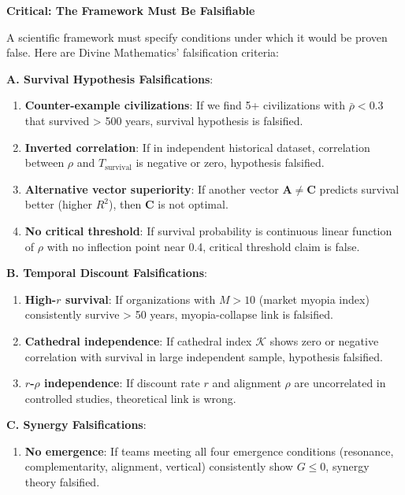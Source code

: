 \documentclass[11pt,a4paper]{article}
\theoremstyle{definition}
\theoremstyle{remark}
\begin{document}
\begin{small}
\begin{enumerate}
\begin{mdframed}[backgroundcolor=red!10,linewidth=2pt,linecolor=red!70!black]
\textbf{Critical: The Framework Must Be Falsifiable}

A scientific framework must specify conditions under which it would be proven false. Here are Divine Mathematics' falsification criteria:

\textbf{A. Survival Hypothesis Falsifications}:
\begin{enumerate}
    \item \textbf{Counter-example civilizations}: If we find 5+ civilizations with \(\bar{\rho} < 0.3\) that survived > 500 years, survival hypothesis is falsified.
    
    \item \textbf{Inverted correlation}: If in independent historical dataset, correlation between \(\rho\) and \(T_{\text{survival}}\) is negative or zero, hypothesis falsified.
    
    \item \textbf{Alternative vector superiority}: If another vector \(\mathbf{A} \neq \mathbf{C}\) predicts survival better (higher \(R^2\)), then \(\mathbf{C}\) is not optimal.
    
    \item \textbf{No critical threshold}: If survival probability is continuous linear function of \(\rho\) with no inflection point near 0.4, critical threshold claim is false.
\end{enumerate}

\textbf{B. Temporal Discount Falsifications}:
\begin{enumerate}
    \item \textbf{High-\(r\) survival}: If organizations with \(M > 10\) (market myopia index) consistently survive > 50 years, myopia-collapse link is falsified.
    
    \item \textbf{Cathedral independence}: If cathedral index \(\mathcal{K}\) shows zero or negative correlation with survival in large independent sample, hypothesis falsified.
    
    \item \textbf{\(r\)-\(\rho\) independence}: If discount rate \(r\) and alignment \(\rho\) are uncorrelated in controlled studies, theoretical link is wrong.
\end{enumerate}

\textbf{C. Synergy Falsifications}:
\begin{enumerate}
    \item \textbf{No emergence}: If teams meeting all four emergence conditions (resonance, complementarity, alignment, vertical) consistently show \(G \leq 0\), synergy theory falsified.
    

\end{enumerate}
\end{mdframed}
\end{enumerate}
\end{small}
\end{document}
